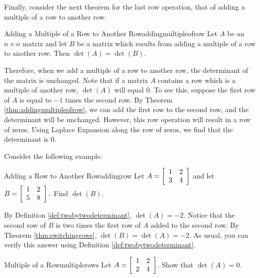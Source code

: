 Finally, consider the next theorem for the last row operation, that of adding a multiple of a row
to another row. 

\begin{theorem}{Adding a Multiple of a Row to Another Row}{addingmultipleofrow}
Let $A$ be an $n\times n$ matrix and let $B$ be a matrix
which results from adding a multiple of a row to another row.
 Then $\det \left( A\right) =\det
\left( B \right) $.
\end{theorem}

Therefore, when we add a multiple of a row to another row, the determinant of the matrix is unchanged. 
Note that if a matrix $A$ contains a row which is a multiple of another row, $\det \left(A\right)$ will equal $0$. To see this,
suppose the first row of $A$ is equal to $-1$ times the second row. By Theorem \ref{thm:addingmultipleofrow}, we can 
add the first row to the second row, and the determinant will be unchanged. However, this row operation will result in a row of zeros.
Using Laplace Expansion along the row of zeros, we find that the determinant is $0$. 

Consider the following example.

\begin{example}{Adding a Row to Another Row}{addingrow}
Let $A=\left[
\begin{array}{rr}
1 & 2 \\
3 & 4
\end{array}
\right] $ and let $B=\left[
\begin{array}{rr}
1 & 2 \\
5 & 8
\end{array}
\right] .$ 
Find $\det \left(B\right)$.
\end{example}

\begin{solution}
By Definition \ref{def:twobytwodeterminant}, $\det \left(A\right) = -2$. 
Notice that the second row of $B$ is two times the first row of $A$ added
to the second row. 
By Theorem \ref{thm:switchingrows}, $\det \left( B\right) = \det \left( A \right)
=-2$.
As usual, you can verify this answer using Definition \ref{def:twobytwodeterminant}.
\end{solution}

\begin{example}{Multiple of a Row}{multiplerows}
Let $A = \left[ \begin{array}{rr}
1 & 2 \\
2 & 4 
\end{array} \right]$. Show that $\det \left( A \right) = 0$. 
\end{example}

